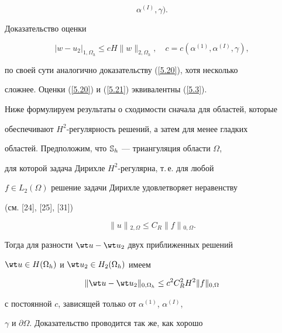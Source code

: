 \begin{pf}
\begin{equation}
\alpha^{(I)},\gamma).


\end{equation}


Доказательство оценки


\begin{equation}\label{5.21}


|w-u_2|_{1,\Omega_h}\le cH\|w\|_{2,\Omega_h},\quad c=c(\alpha^{(1)},


\alpha^{(I)},


\gamma),


\end{equation}


по своей сути аналогично доказательству (\ref{5.20}), хотя несколько


сложнее. Оценки (\ref{5.20}) и (\ref{5.21}) эквивалентны (\ref{5.3}).


\end{pf}





Ниже формулируем результаты о сходимости сначала для областей, которые


обеспечивают $H^2$-регулярность решений, а затем для менее гладких


областей. Предположим, что $\Bbb{S}_h$ --- триангуляция области $\Omega$,


для которой задача Дирихле $H^2$-регулярна, т.\,е. для любой


$f\in L_2(\Omega)$ решение задачи Дирихле удовлетворяет неравенству


(см. [24], [25], [31])


\begin{equation}\label{5.22}


\|u\|{_{2,\Omega}}\le C_R\|f\|{_{0,\Omega}}.


\end{equation}


Тогда для разности $\wt u-\wt u_2$ двух приближенных решений


$\wt u\in H(\Omega_h)$ и $\wt u_2\in H_2(\Omega_h)$ имеем


\begin{equation}\label{5.23}


\|\wt u-\wt u_2\|{_{0,\Omega_h}}\le c^2 C_R^2H^2\|f\|{_{0,\Omega}}


\end{equation}


с постоянной $c$, зависящей только от $\alpha^{(1)}$, $\alpha^{(I)}$,


$\gamma$ и $\partial\Omega$. Доказательство проводится так же, как хорошо



